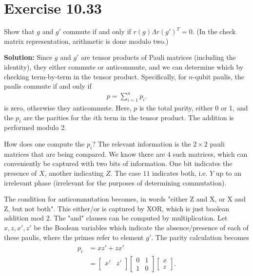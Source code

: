 \documentclass{book}
\begin{document}
\section*{Exercise 10.33}
    Show that $g$ and $g'$ commute if and only if $r(g) \Lambda r(g')^T = 0$. (In the check matrix representation, arithmetic is done modulo two.)
    
    \textbf{Solution:} Since $g$ and $g'$ are tensor products of Pauli matrices (including the identity), they either commute or anticommute, and we can determine which by checking term-by-term in the tensor product. Specifically, for $n$-qubit paulis, the paulis commute if and only if
    \begin{align}
        p = \sum_{i=1}^n p_i.
    \end{align}
    is zero, otherwise they anticommute. Here, $p$ is the total parity, either 0 or 1, and the $p_i$ are the parities for the $i$th term in the tensor product. The addition is performed modulo 2.

    How does one compute the $p_i$? The relevant information is the $2\times 2$ pauli matrices that are being compared. We know there are $4$ such matrices, which can conveniently be captured with two bits of information. One bit indicates the presence of $X$, another indicating $Z$. The case $11$ indicates both, i.e. $Y$ up to an irrelevant phase (irrelevant for the purposes of determining commutation). 
    
    The condition for anticommutation becomes, in words "either Z and X, or X and Z, but not both". This either/or is captured by XOR, which is just boolean addition mod 2. The "and" clauses can be computed by multiplication. Let $x, z, x', z'$ be the Boolean variables which indicate the absence/presence of each of these paulis, where the primes refer to element $g'$. The parity calculation becomes
    \begin{align}
    \begin{aligned}
        p_i &= x z' + z x' \\[1.5ex]
        &= \begin{bmatrix}
            x' & z' \\
        \end{bmatrix} \begin{bmatrix}
            0 & 1 \\
            1 & 0
        \end{bmatrix} \begin{bmatrix}
            x \\
            z
        \end{bmatrix}.
    \end{aligned}
    \end{align}
    
\end{document}
